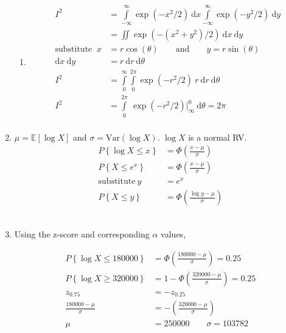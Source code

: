 \begin{enumerate}
\begin{enumerate}
			\item \begin{align}
				I^2 &= \int\limits_{-\infty}^{\infty} \exp(-x^2/2) \ \mathrm{d}x \int\limits_{-\infty}^{\infty} \exp(-y^2/2) \ \mathrm{d}y \nonumber \\
				&= \iint \exp(-(x^2+y^2)/2) \ \mathrm{d}x \ \mathrm{d}y \nonumber \\
				\text{substitute }\ x &= r\cos(\theta) \qquad \text{and} \qquad y = r\sin(\theta) \\
				\mathrm{d}x \ \mathrm{d}y &= r\ \mathrm{d}r\ \mathrm{d}\theta \nonumber \\
				I^2 &=  \int\limits_{0}^{\infty}  \int\limits_{0}^{2\pi} \exp(-r^2/2)\ r\ \mathrm{d}r\ \mathrm{d}\theta \nonumber \\
				I^2 &= \int\limits_{0}^{2\pi}\ \exp(-r^2/2)\Big|_{\infty}^0\ \mathrm{d}\theta = 2\pi \\
			\end{align}
		\end{enumerate}
	
	
	\item 
	
		$ \mu = \mathbb{E}[\log X]$ and $\sigma = \mathrm{Var}(\log X)$. $ \log X $ is a normal RV.\\
		\begin{align}
			P \left\{\log X \leq x\right\} &= \Phi\left(\frac{x - \mu}{\sigma}\right) \nonumber \\
			P \left\{X \leq e^x\right\} &= \Phi\left(\frac{x - \mu}{\sigma}\right) \nonumber \\
			\text{substitute}\ y &= e^x \\
			P \left\{X \leq y\right\} &= \Phi\left(\frac{\log y - \mu}{\sigma}\right)
		\end{align}\\
	
	
	\item Using the z-score and corresponding $ \alpha $ values,
	
		\begin{align}
			P \left\{\log X \leq 180000\right\} &= \Phi\left(\frac{180000 - \mu}{\sigma}\right) = 0.25 \nonumber \\
			P \left\{\log X \geq 320000\right\} &= 1 - \Phi\left(\frac{320000 - \mu}{\sigma}\right) = 0.25 \nonumber \\
			z_{0.75} &= - z_{0.25} \\
			\frac{180000 - \mu}{\sigma} &= - \left(\frac{320000 - \mu}{\sigma}\right) \\
			\mu &= 250000 \qquad \sigma = 103782 \nonumber \\
		\end{align}\\
		

\end{enumerate}
